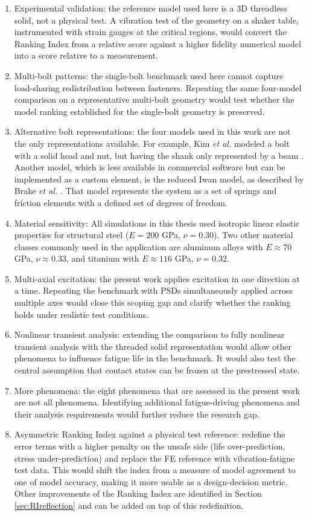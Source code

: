 \documentclass[a4paper,twoside]{bth}
\begin{document}
\begin{enumerate}
    \item Experimental validation: the reference model used here is a 3D threadless solid, not a physical test. A vibration test of the geometry on a shaker table, instrumented with strain gauges at the critical regions, would convert the Ranking Index from a relative score against a higher fidelity numerical model into a score relative to a measurement.
    \item Multi-bolt patterns: the single-bolt benchmark used here cannot capture load-sharing redistribution between fasteners. Repeating the same four-model comparison on a representative multi-bolt geometry would test whether the model ranking established for the single-bolt geometry is preserved.
    \item Alternative bolt representations: the four models used in this work are not the only representations available. For example, Kim \textit{et al.} modeled a bolt with a solid head and nut, but having the shank only represented by a beam \cite{27}. Another model, which is less available in commercial software but can be implemented as a custom element, is the reduced Iwan model, as described by Brake \textit{et al.} \cite{brake_reduced_2017}. That model represents the system as a set of springs and friction elements with a defined set of degrees of freedom.
    \item Material sensitivity: All simulations in this thesis used isotropic linear elastic properties for structural steel ($E=200$ GPa, $\nu = 0.30$). Two other material classes commonly used in the application are aluminum alloys with $E\approx 70$ GPa, $\nu \approx 0.33$, and titanium with $E\approx116$ GPa, $\nu = 0.32$.
    \item Multi-axial excitation: the present work applies excitation in one direction at a time. Repeating the benchmark with PSDs simultaneously applied across multiple axes would close this scoping gap and clarify whether the ranking holds under realistic test conditions.
    \item Nonlinear transient analysis: extending the comparison to fully nonlinear transient analysis with the threaded solid representation would allow other phenomena to influence fatigue life in the benchmark. It would also test the central assumption that contact states can be frozen at the prestressed state.
    \item More phenomena: the eight phenomena that are assessed in the present work are not all phenomena. Identifying additional fatigue-driving phenomena and their analysis requirements would further reduce the research gap.
    \item Asymmetric Ranking Index against a physical test reference: redefine the error terms with a higher penalty on the unsafe side (life over-prediction, stress under-prediction) and replace the \ac{FE} reference with vibration-fatigue test data. This would shift the index from a measure of model agreement to one of model accuracy, making it more usable as a design-decision metric. Other improvements of the Ranking Index are identified in Section \ref{sec:RIreflection} and can be added on top of this redefinition.
\end{enumerate}
\end{document}
